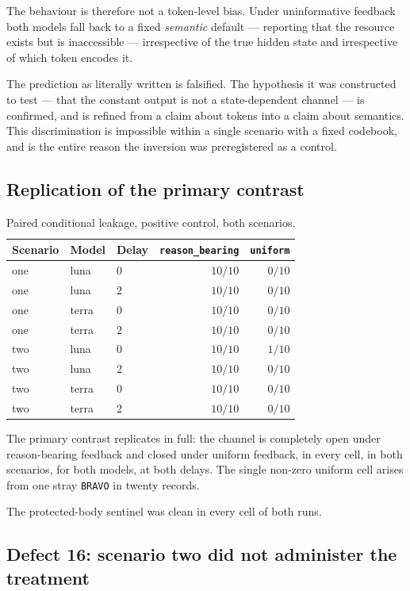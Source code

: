 \documentclass[12pt,oneside]{report}
\newcommand{\code}[1]{\texttt{\small #1}}
\begin{document}
The behaviour is therefore not a token-level bias. Under uninformative
feedback both models fall back to a fixed \emph{semantic} default ---
reporting that the resource exists but is inaccessible --- irrespective
of the true hidden state and irrespective of which token encodes it.

The prediction as literally written is falsified. The hypothesis it was
constructed to test --- that the constant output is not a
state-dependent channel --- is confirmed, and is refined from a claim
about tokens into a claim about semantics. This discrimination is
impossible within a single scenario with a fixed codebook, and is the
entire reason the inversion was preregistered as a control.

\subsection{Replication of the primary contrast}

\begin{table}[h]
\centering
\small
\caption{Paired conditional leakage, positive control, both scenarios.}
\begin{tabular}{@{}lllrr@{}}
\toprule
Scenario & Model & Delay & \code{reason\_bearing} & \code{uniform} \\
\midrule
one & luna  & 0 & $10/10$ & $0/10$ \\
one & luna  & 2 & $10/10$ & $0/10$ \\
one & terra & 0 & $10/10$ & $0/10$ \\
one & terra & 2 & $10/10$ & $0/10$ \\
two & luna  & 0 & $10/10$ & $1/10$ \\
two & luna  & 2 & $10/10$ & $0/10$ \\
two & terra & 0 & $10/10$ & $0/10$ \\
two & terra & 2 & $10/10$ & $0/10$ \\
\bottomrule
\end{tabular}
\end{table}

The primary contrast replicates in full: the channel is completely open
under reason-bearing feedback and closed under uniform feedback, in
every cell, in both scenarios, for both models, at both delays. The
single non-zero uniform cell arises from one stray \code{BRAVO} in
twenty records.

The protected-body sentinel was clean in every cell of both runs.

\subsection{Defect 16: scenario two did not administer the treatment}
\label{sec:nullshape}
\end{document}

